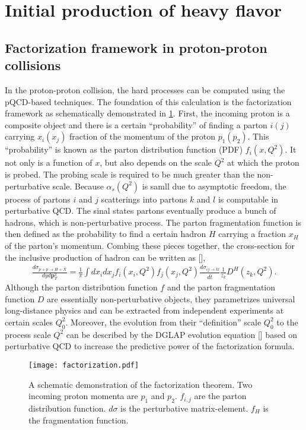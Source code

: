 \section{Initial production of heavy flavor}
\label{section:hard}
\subsection{Factorization framework in proton-proton collisions}
In the proton-proton collision, the hard processes can be computed using the pQCD-based techniques.
The foundation of this calculation is the factorization framework as schematically demonstrated in \ref{fig:factorization}.
First, the incoming proton is a composite object and there is a certain ``probability'' of finding a parton $i(j)$ carrying $x_i(x_j)$ fraction of the momentum of the proton $p_1(p_2)$.
This ``probability'' is known as the parton distribution function (PDF) $f_i(x, Q^2)$.
It not only is a function of $x$, but also depends on the scale $Q^2$ at which the proton is probed.
The probing scale is required to be much greater than the non-perturbative scale.
Because $\alpha_s(Q^2)$ is samll due to asymptotic freedom, the process of partons $i$ and $j$ scatterings into partons $k$ and $l$ is computable in perturbative QCD.
The sinal states partons eventually produce a bunch of hadrons, which is non-perturbative process.
The parton fragmentation function is then defined as the probability to find a certain hadron $H$ carrying a fraction $x_H$ of the parton's momentum.
Combing these pieces together, the cross-section for the inclusive production of hadron can be written as [],
\begin{eqnarray}
\frac{d\sigma_{p+p\rightarrow H+X}}{dy d\mathbf{p}_T^2} = \frac{1}{\pi}\int dx_i dx_j f_i(x_i, Q^2) f_j(x_j, Q^2) \frac{d\sigma_{ij\rightarrow kl}}{d\hat{t}} \frac{1}{z_k}D^H(z_k, Q^2).
\end{eqnarray}
Although the parton distribution function $f$ and the parton fragmentation function $D$ are essentially non-perturbative objects, they parametrizes universal long-distance physics and can be extracted from independent experiments at certain scales $Q_0^2$.
Moreover, the evolution from their ``definition'' scale $Q_0^2$ to the process scale $Q^2$ can be described by the DGLAP evolution equation [] based on perturbative QCD to increase the predictive power of the factorization formula.

\begin{figure}
\centering
\texttt{[image: factorization.pdf]}
\caption{A schematic demonstration of the factorization theorem. Two incoming proton momenta are $p_1$ and $p_2$. $f_{i,j}$ are the parton distribution function. $d\sigma$ is the perturbative matrix-element. $f_H$ is the fragmentation function.}
\label{fig:factorization}
\end{figure}


